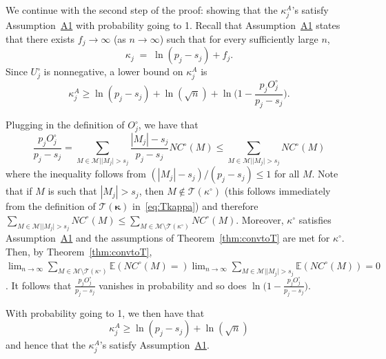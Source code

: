 \documentclass[
  12pt]{article}
\newcommand{\E}{\mathbb{E}}
\newcommand{\M}{\mathcal{M}}
\newcommand{\T}{\mathcal{T}}
\newcommand{\bkappa}{\boldsymbol{\kappa}}
\begin{document}
We continue with the second step of the proof: showing that the $\kappa^{A}_j$'s satisfy Assumption~\hyperlink{lab:A1}{A1} with probability going to 1. Recall that Assumption~\hyperlink{lab:A1}{A1} states that there exists $f_j\to \infty$ (as $n\to \infty$) such that for every sufficiently large $n$,
\begin{equation*}
    \kappa_j \;=\;\ln(p_j-s_j) + f_j.
\end{equation*}
Since $U_j^{\circ}$ is nonnegative, a lower bound on $\kappa^{A}_j$ is %
\begin{equation}\label{eq:decompstep2pen2}
    \kappa^{A}_j
    \geq  \ln(p_j-s_j)+\ln(\sqrt{n})+\ln\Big(1-\frac{p_j O^{\circ}_j}{p_j-s_j}\Big).
\end{equation}

Plugging in the definition of $O^{\circ}_j$, we have that
$$\frac{p_j O^{\circ}_j}{p_j-s_j} =  \sum_{M \in \M | |M_j| > s_j}\frac{|M_j|-s_j}{p_j-s_j}NC^{\circ}(M)\leq \sum_{M \in \M | |M_j| > s_j}NC^{\circ}(M)$$
where the inequality follows from $(|M_j|-s_j)/(p_j-s_j)\leq 1$ for all $M$.
Note that if $M$ is such that $|M_j|>s_j$, then $M\not\in\T(\kappa^{\circ})$ (this follows immediately from the definition of $\T(\bkappa)$ in~\eqref{eq:Tkappa})  and therefore $\sum_{M \in \M | |M_j| > s_j}NC^{\circ}(M)\leq \sum_{M \in \M \setminus \T(\kappa^{\circ})}NC^{\circ}(M)$. Moreover, $\kappa^{\circ}$ satisfies Assumption~\hyperlink{lab:A1}{A1} and the assumptions of Theorem~\ref{thm:convtoT} are met for $\kappa^{\circ}$.
Then, by Theorem~\ref{thm:convtoT}, $\lim_{n\to\infty} \sum_{M \in \M \setminus \T(\kappa^{\circ})}\E(NC^{\circ}(M)=)\lim_{n\to\infty}\sum_{M \in \M | |M_j| > s_j}\E(NC^{\circ}(M)) = 0$. It follows that $\frac{p_j O^{\circ}_j}{p_j-s_j}$ vanishes in probability and so does $\ln\Big(1-\frac{p_j O^{\circ}_j}{p_j-s_j}\Big)$.

With probability going to 1, we then have that
\begin{equation}\label{eq:finallowerboundkappaj2}\kappa^{A}_j 
    \geq  \ln(p_j-s_j)+\ln(\sqrt{n})
\end{equation}
and hence that the $\kappa^{A}_j$'s satisfy Assumption~\hyperlink{lab:A1}{A1}.
\end{document}

